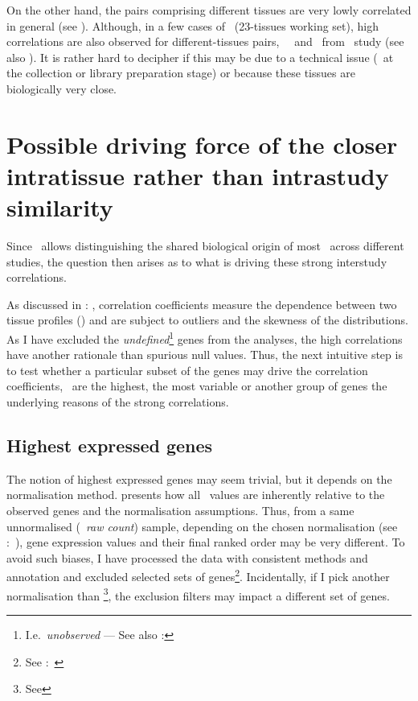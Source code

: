 On the other hand,
the pairs comprising different tissues are very lowly correlated in general
(see ).
Although, in a few cases of \setTwo\ (23-tissues working set),
high correlations are also observed for different-tissues pairs,
\eg\ \Fallopian\ and \Uterus\ from \gtex\ study
(see also ).
It is rather hard to decipher if this may be due to a technical issue
(\eg\ at the collection or library preparation stage)
or because these tissues are biologically very close.

\section{Possible driving force of the closer intratissue rather than intrastudy
similarity}

Since \Rnaseq\ allows distinguishing the shared biological origin
of most \treps\ across different studies,
the question then arises as to what is driving these strong interstudy
correlations.

As discussed in : ,
correlation coefficients measure the dependence between two tissue profiles (\treps)
and are subject to outliers and the skewness of the distributions.
As I have excluded the \emph{undefined}\footnote{I.e.\
\emph{unobserved} --- See also
: }
genes from the analyses,
the high correlations have another rationale than spurious null values.
Thus, the next intuitive step is to test
whether a particular subset of the genes may drive the correlation coefficients,
\ie\ are the highest, the most variable or another group of genes
the underlying reasons of the strong correlations.

\subsection{Highest expressed genes}

The notion of highest expressed genes may seem trivial,
but it depends on the normalisation method.
 presents how all \Rnaseq\ values are inherently relative
to the observed genes and the normalisation assumptions.
Thus, from a same unnormalised (\ie\ \emph{raw count}) sample,
depending on the chosen normalisation
(see :~),
gene expression values and their final ranked order may be very different.
To avoid such biases,
I have processed the data with consistent methods and annotation
and excluded selected sets of
genes\footnote{See :~}.
Incidentally, if I pick another normalisation than \FPKM\footnote{See
\Cref{eq:rpkm-fx}},
the exclusion filters may impact a different set of genes.

